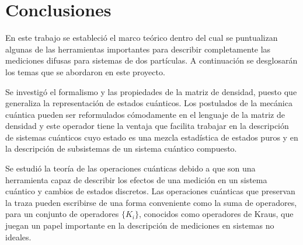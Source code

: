 \chapter{Conclusiones }

En este trabajo se estableció el marco teórico dentro del cual se puntualizan
algunas de las herramientas importantes para describir completamente las
mediciones difusas para sistemas de dos partículas. A continuación se desglosarán los temas que se abordaron en este proyecto.  

Se investigó el formalismo y las propiedades de la matriz de densidad, puesto que generaliza la representación de estados cuánticos. Los postulados de la mecánica cuántica pueden ser reformulados cómodamente en el lenguaje de la matriz de densidad y este operador tiene la ventaja que facilita trabajar en la descripción de sistemas cuánticos cuyo estado es una mezcla estadística de estados puros y en la descripción de subsistemas de un sistema cuántico compuesto. 

Se estudió la teoría de las operaciones cuánticas debido a que son una herramienta  
capaz de describir los efectos de una medición en un sistema cuántico y cambios
de estados discretos. 
Las operaciones cuánticas que preservan la traza pueden escribirse de una forma conveniente como la suma de operadores, para un conjunto de operadores $\{K_i\}$, conocidos como operadores de Kraus, que juegan un papel importante en la descripción de mediciones en sistemas no ideales. 

